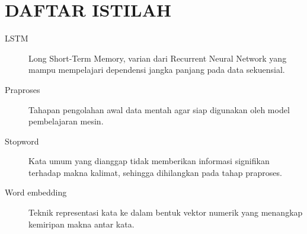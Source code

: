 
\chapter*{DAFTAR ISTILAH}
\begin{description}
  \item[LSTM] Long Short-Term Memory, varian dari Recurrent Neural
    Network yang mampu mempelajari dependensi jangka panjang pada
    data sekuensial.
  \item[Praproses] Tahapan pengolahan awal data mentah agar siap
    digunakan oleh model pembelajaran mesin.
  \item[Stopword] Kata umum yang dianggap tidak memberikan informasi
    signifikan terhadap makna kalimat, sehingga dihilangkan pada
    tahap praproses.
  \item[Word embedding] Teknik representasi kata ke dalam bentuk
    vektor numerik yang menangkap kemiripan makna antar kata.
\end{description}
